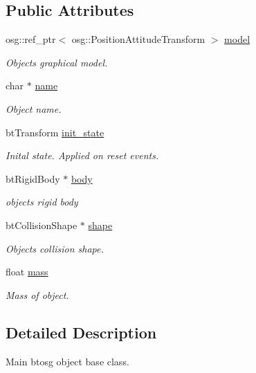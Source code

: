 \subsection*{Public Attributes}
\begin{DoxyCompactItemize}
\item 
osg\+::ref\+\_\+ptr$<$ osg\+::\+Position\+Attitude\+Transform $>$ \mbox{\hyperlink{classbtosgObject_afd15726e7a214212d6d5815f8ac1ac6c}{model}}
\begin{DoxyCompactList}\small\item\em Object\textquotesingle{}s graphical model. \end{DoxyCompactList}\item 
char $\ast$ \mbox{\hyperlink{classbtosgObject_a12396e1362797a75473a2e833b579cc9}{name}}
\begin{DoxyCompactList}\small\item\em Object name. \end{DoxyCompactList}\item 
bt\+Transform \mbox{\hyperlink{classbtosgObject_a2dee023f311114e200df9b04c8c1b400}{init\+\_\+state}}
\begin{DoxyCompactList}\small\item\em Inital state. Applied on reset events. \end{DoxyCompactList}\item 
bt\+Rigid\+Body $\ast$ \mbox{\hyperlink{classbtosgObject_a64ccde0543c184ed1749fdb9c9699785}{body}}
\begin{DoxyCompactList}\small\item\em object\textquotesingle{}s rigid body \end{DoxyCompactList}\item 
bt\+Collision\+Shape $\ast$ \mbox{\hyperlink{classbtosgObject_a0f6a8da01cf643c321bffe86e42604b0}{shape}}
\begin{DoxyCompactList}\small\item\em Object\textquotesingle{}s collision shape. \end{DoxyCompactList}\item 
float \mbox{\hyperlink{classbtosgObject_a2418bb2194d5e9b0f1c51c84672ba7d1}{mass}}
\begin{DoxyCompactList}\small\item\em Mass of object. \end{DoxyCompactList}\end{DoxyCompactItemize}


\subsection{Detailed Description}
Main btosg object base class. 

